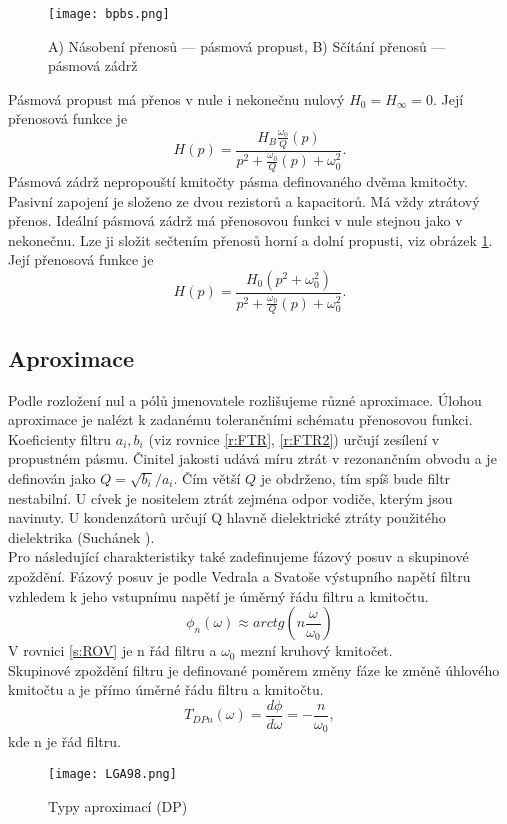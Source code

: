 \begin{figure}[h]
\centering
\texttt{[image: bpbs.png]}
\caption[A) Násobení přenosů --- pásmová propust, B) Sčítání přenosů --- pásmová zádrž]{A) Násobení přenosů --- pásmová propust, B) Sčítání přenosů --- pásmová zádrž \cite{10} \label{s:BPBS}}
\end{figure}
\noindent Pásmová propust má přenos v nule i nekonečnu nulový $H_{0} = H_{\infty} = 0$. Její přenosová funkce je~\cite{9}
\begin{equation}
H(p) = \frac{H_{B} \frac{\omega _0}{Q} (p) }{p^2 + \frac{\omega _0}{Q}(p) + \omega _0 ^2}.
\end{equation}
Pásmová zádrž nepropouští kmitočty pásma definovaného dvěma kmitočty. Pasivní zapojení je složeno ze dvou rezistorů a kapacitorů. Má vždy ztrátový přenos. Ideální pásmová zádrž má přenosovou funkci v nule stejnou jako v nekonečnu. Lze ji složit sečtením přenosů horní a dolní propusti, viz obrázek \ref{s:BPBS}. Její přenosová funkce je~\cite{9}
\begin{equation}
H(p) = \frac{H_{0} (p^2 + \omega_0^2)}{p^2 + \frac{\omega _0}{Q}(p) + \omega _0 ^2}.
\end{equation}
\subsection{Aproximace}
Podle rozložení nul a pólů jmenovatele rozlišujeme různé aproximace. Úlohou aproximace je nalézt k zadanému tolerančními schématu přenosovou funkci. Koeficienty filtru $a_i, b_i$ (viz rovnice \ref{r:FTR}, \ref{r:FTR2}) určují zesílení v propustném pásmu. Činitel jakosti udává míru ztrát v rezonančním obvodu a je definován jako $Q = \sqrt{b_i}/a_i$. Čím větší $Q$ je obdrženo, tím spíš bude filtr nestabilní. U cívek je nositelem ztrát zejména odpor vodiče, kterým jsou navinuty. U kondenzátorů určují Q hlavně dielektrické ztráty použitého dielektrika (Suchánek \cite{6}).\\
Pro následující charakteristiky také zadefinujeme fázový posuv a skupinové zpoždění. Fázový posuv je podle Vedrala a Svatoše \cite{8} výstupního napětí filtru vzhledem k jeho vstupnímu napětí je úměrný řádu filtru a kmitočtu.
\begin{equation}
\phi _n(\omega) \approx arctg(n \frac{\omega}{\omega _0}) \label{s:ROV}
\end{equation}
V rovnici \ref{s:ROV} je n řád filtru a $\omega _0$ mezní kruhový kmitočet.\\
Skupinové zpoždění filtru je definované poměrem změny fáze ke změně úhlového kmitočtu a je přímo úměrné řádu filtru a kmitočtu.\\
\begin{equation}
T _{DPn}(\omega) = \frac{d\phi}{d\omega} = - \frac{n}{\omega _0},
\end{equation}
\noindent kde n je řád filtru.\\
\begin{figure}[h]
\centering
\texttt{[image: LGA98.png]}
\caption[Typy aproximací (DP)]{Typy aproximací (DP)\cite{11}}
\end{figure}
